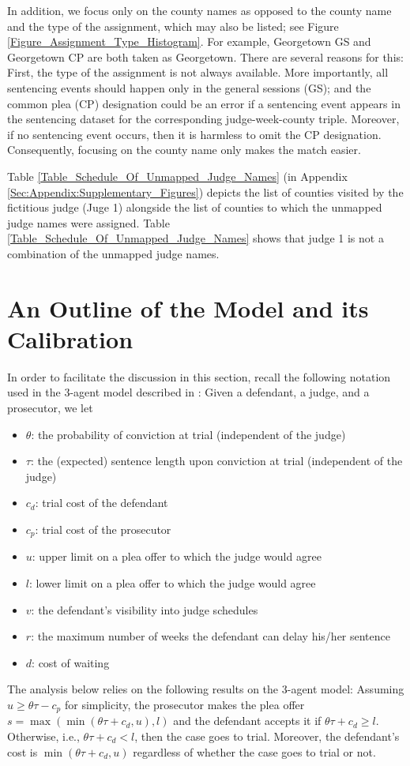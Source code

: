 \documentclass[11pt, oneside]{article}   	%
\theoremstyle{ModifiedStyle}
\begin{document}
	In addition, we focus only on the county names as opposed to the county name and the type of the assignment, which may also be listed; see Figure \ref{Figure_Assignment_Type_Histogram}. For example, Georgetown GS and Georgetown CP are both taken as Georgetown. There are several reasons for this: First, the type of the assignment is not always available. More importantly, all sentencing events should happen only in the general sessions (GS); and the common plea (CP) designation could be an error if a sentencing event appears in the sentencing dataset for the corresponding judge-week-county triple. Moreover, if no sentencing event occurs, then it is harmless to omit the CP designation. Consequently, focusing on the county name only makes the match easier.

	Table \ref{Table_Schedule_Of_Unmapped_Judge_Names} (in Appendix \ref{Sec:Appendix:Supplementary_Figures}) depicts the list of counties visited by the fictitious judge (Juge 1) alongside the list of counties to which the unmapped judge names were assigned. Table \ref{Table_Schedule_Of_Unmapped_Judge_Names} shows that judge 1 is not a combination of the unmapped judge names.

\section{An Outline of the Model and its Calibration}
	In order to facilitate the discussion in this section, recall the following notation used in the 3-agent model described in \citet[Chapter 3]{Can_Disseration}: Given a defendant, a judge, and a prosecutor, we let
	\begin{itemize}
		\item[] $\theta$: the probability of conviction at trial (independent of the judge)
		\item[] $\tau$: the (expected) sentence length upon conviction at trial (independent of the judge)
		\item[] $c_d$: trial cost of the defendant
		\item[] $c_p$: trial cost of the prosecutor
		\item[] $u$: upper limit on a plea offer to which the judge would agree
		\item[] $l$: lower limit on a plea offer to which the judge would agree
		\item[] $v$: the defendant's visibility into judge schedules
		\item[] $r$: the maximum number of weeks the defendant can delay
		his/her sentence
		\item[] $d$: cost of waiting
	\end{itemize}
	The analysis below relies on the following results on the 3-agent model: Assuming $u\geq \theta\tau - c_p$ for simplicity, the prosecutor makes the plea offer $s=\max(\min(\theta \tau+c_d,u),l)$ and the defendant accepts it if $\theta \tau +c_d \geq l$. Otherwise, i.e., $\theta \tau + c_d < l$, then the case goes to trial. Moreover, the defendant's cost is $\min(\theta \tau+c_d,u)$ regardless of whether the case goes to trial or not.
\end{document}
